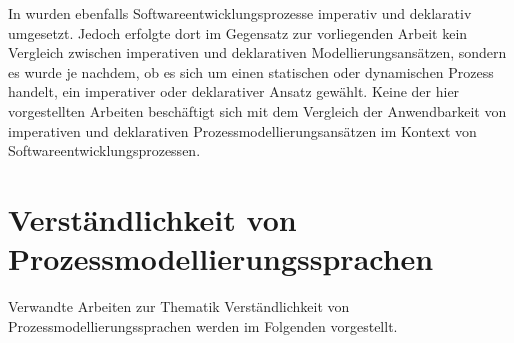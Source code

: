  In \cite{sabrina795, sabrina734, sabrina758} wurden ebenfalls Softwareentwicklungsprozesse imperativ und deklarativ umgesetzt. Jedoch erfolgte dort im Gegensatz zur vorliegenden Arbeit kein Vergleich zwischen imperativen und deklarativen Modellierungsansätzen, sondern es wurde je nachdem, ob es sich um einen statischen oder dynamischen Prozess handelt, ein imperativer oder deklarativer Ansatz gewählt.\newline
Keine der hier vorgestellten Arbeiten beschäftigt sich mit dem Vergleich der Anwendbarkeit von imperativen und deklarativen Prozessmodellierungsansätzen im Kontext von Softwareentwicklungsprozessen.


\section{Verständlichkeit von Prozessmodellierungssprachen}

Verwandte Arbeiten zur Thematik Verständlichkeit von Prozessmodellierungssprachen werden im Folgenden vorgestellt.

